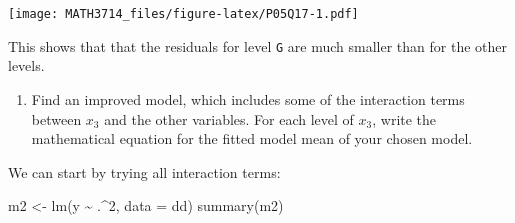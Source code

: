 \documentclass[
  a4paper,
]{article}
\newenvironment{Shaded}{\begin{snugshade}}{\end{snugshade}}
\newcommand{\AttributeTok}[1]{\textcolor[rgb]{0.77,0.63,0.00}{#1}}
\newcommand{\DecValTok}[1]{\textcolor[rgb]{0.00,0.00,0.81}{#1}}
\newcommand{\FunctionTok}[1]{\textcolor[rgb]{0.00,0.00,0.00}{#1}}
\newcommand{\NormalTok}[1]{#1}
\newcommand{\OtherTok}[1]{\textcolor[rgb]{0.56,0.35,0.01}{#1}}
\newcommand{\SpecialCharTok}[1]{\textcolor[rgb]{0.00,0.00,0.00}{#1}}
\providecommand{\tightlist}{%
  \setlength{\itemsep}{0pt}\setlength{\parskip}{0pt}}
\theoremstyle{definition}
\theoremstyle{definition}
\theoremstyle{definition}
\theoremstyle{definition}
\theoremstyle{remark}
\begin{document}
\begin{myanswers}
\texttt{[image: MATH3714\_files/figure-latex/P05Q17-1.pdf]}

This shows that that the residuals for level \texttt{G} are much smaller
than for the other levels.

\end{myanswers}

\begin{enumerate}
\def\labelenumi{\alph{enumi}.}
\setcounter{enumi}{2}
\tightlist
\item
  Find an improved model, which includes some of the interaction
  terms between \(x_3\) and the other variables. For each level of \(x_3\),
  write the mathematical equation for the fitted model mean of your
  chosen model.
\end{enumerate}

\begin{myanswers}
We can start by trying all interaction terms:

\begin{Shaded}
\begin{Highlighting}[]
\NormalTok{m2 }\OtherTok{\textless{}{-}} \FunctionTok{lm}\NormalTok{(y }\SpecialCharTok{\textasciitilde{}}\NormalTok{ .}\SpecialCharTok{\^{}}\DecValTok{2}\NormalTok{, }\AttributeTok{data =}\NormalTok{ dd)}
\FunctionTok{summary}\NormalTok{(m2)}
\end{Highlighting}
\end{Shaded}


\end{myanswers}
\end{document}
